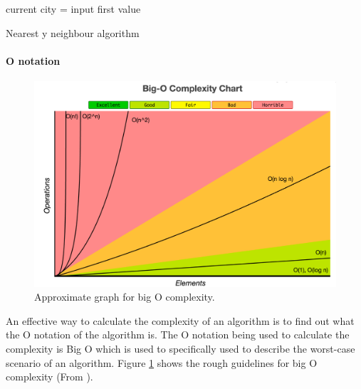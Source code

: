 \documentclass[conference,backref=page]{acmsiggraph}
\begin{document}
\begin{algorithm}[h]
	current city = input first value\\
	\caption{Nearest y neighbour algorithm}
	\label{nny}
\end{algorithm}

\pagebreak
\paragraph{O notation} \hfill
 
\begin{figure}[h]
	\includegraphics[width=\columnwidth]{images/OCheatSheet.png}
	\caption{Approximate graph for big O complexity.}
	\label{O}
\end{figure}
An effective way to calculate the complexity of an algorithm is to find out what the O notation of the algorithm is. The O notation being used to calculate the complexity is Big O which is used to specifically used to describe the worst-case scenario of an algorithm. 
Figure \ref{O} shows the rough guidelines for big O complexity (From \cite{bigo}). 
\end{document}
